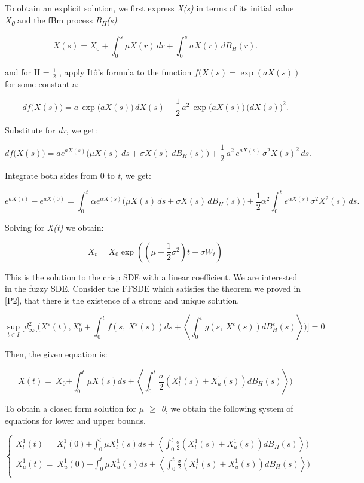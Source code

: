 \documentclass[12pt,a4paper]{report}
\numberwithin{equation}{section}
\begin{document}
To obtain an explicit solution, we first express \emph{X(s)} in terms of
its initial value \emph{X\textsubscript{0}} and the fBm process
\emph{B\textsubscript{H}(s)}:

\[
X(s)=X_{0}+\int_{0}^{s}\mu X(r)\,dr+\int_{0}^{s}\sigma X(r)\,dB_{H}(r).
\]


and for H = $\frac{1}{2}$ , apply Itô's formula to the function
\(f(X(s) = \exp(aX(s))\) for some constant a:

\[
df\!\bigl(X(s)\bigr)
= a\,\exp\!\bigl(aX(s)\bigr)\,dX(s)
+ \frac{1}{2}\,a^{2}\,\exp\!\bigl(aX(s)\bigr)\,\bigl(dX(s)\bigr)^{2}.
\]


Substitute for \emph{dx}, we get:

\[
df\!\bigl(X(s)\bigr)
= a e^{aX(s)}\bigl(\mu X(s)\,ds + \sigma X(s)\,dB_{H}(s)\bigr)
+ \frac{1}{2}\,a^{2}\,e^{aX(s)}\,\sigma^{2}X(s)^{2}\,ds .
\]


Integrate both sides from 0 to \emph{t}, we get:

\[
e^{aX(t)} - e^{aX(0)}
= \int_{0}^{t}\alpha e^{\alpha X(s)}\bigl(\mu X(s)\,ds + \sigma X(s)\,dB_{H}(s)\bigr)
+ \frac{1}{2}\alpha^{2}\int_{0}^{t} e^{\alpha X(s)}\sigma^{2}X^{2}(s)\,ds .
\]

Solving for \emph{X(t)} we obtain: 

\[X_{t} = X_{0}\exp(\left( \mu - \frac{1}{2}\sigma^{2} \right)t + \sigma W_{t})\]

This is the solution to the crisp SDE with a linear coefficient. We are
interested in the fuzzy SDE. Consider the FFSDE which satisfies the
theorem we proved in [P2], that there is the existence of a strong
and unique solution.

\[{\sup_{t \in I}\lbrack}{d_{\infty}^{2}\lbrack(X^{\varepsilon}(t),X_{0}^{\varepsilon} + \int_{0}^{t}{f\left( s,\ X^{\varepsilon}(s) \right)ds + \left\langle \int_{0}^{t}{g\left( s,\ X^{\varepsilon}(s) \right)dB_{H}^{\varepsilon}(s)} \right\rangle)\rbrack = 0}}\]

Then, the given equation is:

\[{X(t) = \ X_{0}}{+ \int_{0}^{t}{\mu X(s)ds + \left\langle \int_{0}^{t}{\frac{\sigma}{2}(X_{l}^{1}(s) + X_{u}^{1}(s))dB_{H}(s)} \right\rangle)}}\]

To obtain a closed form solution for \emph{$\mu$ $\geq$ 0}, we obtain the
following system of equations for lower and upper bounds.

\[\left\{ \begin{matrix}
{X_{l}^{1}(t) = \ X_{l}^{1}(0)}{+ \int_{0}^{t}{\mu X_{l}^{1}(s)ds + \left\langle \int_{0}^{t}{\frac{\sigma}{2}(X_{l}^{1}(s) + X_{u}^{1}(s))dB_{H}(s)} \right\rangle)}} \\
{X_{u}^{1}(t) = \ X_{u}^{1}(0)}{+ \int_{0}^{t}{\mu X_{u}^{1}(s)ds + \left\langle \int_{0}^{t}{\frac{\sigma}{2}(X_{l}^{1}(s) + X_{u}^{1}(s))dB_{H}(s)} \right\rangle)}} \\
\end{matrix} \right.\ \]
\end{document}
